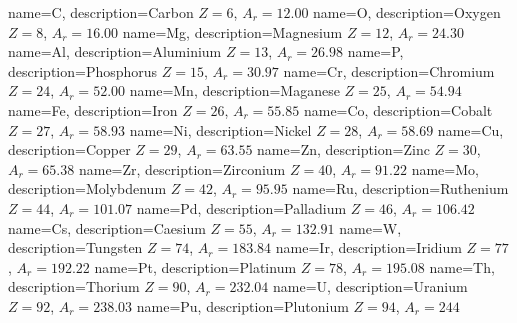 {
    name=C,
    description={Carbon $Z = 6$, $A_r = 12.00$}
}
{
    name=O,
    description={Oxygen $Z = 8$, $A_r = 16.00$}
}
{
    name=Mg,
    description={Magnesium $Z = 12$, $A_r = 24.30$}
}
{
    name=Al,
    description={Aluminium $Z = 13$, $A_r = 26.98$}
}
{
    name=P,
    description={Phosphorus $Z = 15$, $A_r = 30.97$}
}
{
    name=Cr,
    description={Chromium $Z = 24$, $A_r = 52.00$}
}
{
    name=Mn,
    description={Maganese $Z = 25$, $A_r = 54.94$}
}
{
    name=Fe,
    description={Iron $Z = 26$, $A_r = 55.85$}
}
{
    name=Co,
    description={Cobalt $Z = 27$, $A_r = 58.93$}
}
{
    name=Ni,
    description={Nickel $Z = 28$, $A_r = 58.69$}
}
{
    name=Cu,
    description={Copper $Z = 29$, $A_r = 63.55$}
}
{
    name=Zn,
    description={Zinc $Z = 30$, $A_r = 65.38$}
}
{
    name=Zr,
    description={Zirconium $Z = 40$, $A_r = 91.22$}
}
{
    name=Mo,
    description={Molybdenum $Z = 42$, $A_r = 95.95$}
}
{
    name=Ru,
    description={Ruthenium $Z = 44$, $A_r = 101.07$}
}
{
    name=Pd,
    description={Palladium $Z = 46$, $A_r = 106.42$}
}
{
    name=Cs,
    description={Caesium $Z = 55$, $A_r = 132.91$}
}
{
    name=W,
    description={Tungsten $Z = 74$, $A_r = 183.84$}
}
{
    name=Ir,
    description={Iridium $Z = 77$, $A_r = 192.22$}
}
{
    name=Pt,
    description={Platinum $Z = 78$, $A_r = 195.08$}
}
{
    name=Th,
    description={Thorium $Z = 90$, $A_r = 232.04$}
}
{
    name=U,
    description={Uranium $Z = 92$, $A_r = 238.03$}
}
{
    name=Pu,
    description={Plutonium $Z = 94$, $A_r = 244$}
}



